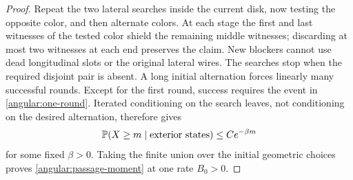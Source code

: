 \begin{proof}
Repeat the two lateral searches inside the current disk, now
testing the opposite color, and then alternate colors.  At each
stage the first and last witnesses of the tested color shield
the remaining middle witnesses; discarding at most two witnesses
at each end preserves the claim.  New blockers cannot use dead
longitudinal slots or the original lateral wires.  The searches
stop when the required disjoint pair is absent.  A long initial
alternation forces linearly many successful rounds.  Except for
the first round, success requires the event in
\eqref{angular:one-round}.  Iterated conditioning on the search
leaves, not conditioning on the desired alternation, therefore
gives
\[
 \mathbb P(X\ge m\mid\text{exterior states})
       \le C e^{-\beta m}
\]
for some fixed \(\beta>0\).  Taking the finite union over the
initial geometric choices proves \eqref{angular:passage-moment}
at one rate \(B_0>0\).


\end{proof}
